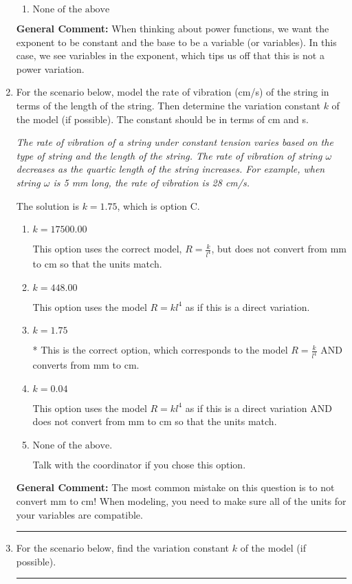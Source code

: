 \documentclass{extbook}[14pt]
\newcommand{\litem}[1]{\item #1

\rule{\textwidth}{0.4pt}}
\begin{document}
\begin{enumerate}
{\begin{enumerate}[label=\Alph*.]
\item \( \text{None of the above} \)


\end{enumerate}

\textbf{General Comment:} When thinking about power functions, we want the exponent to be constant and the base to be a variable (or variables). In this case, we see variables in the exponent, which tips us off that this is not a power variation.
}
\litem{
For the scenario below, model the rate of vibration (cm/s) of the string in terms of the length of the string. Then determine the variation constant $k$ of the model (if possible). The constant should be in terms of cm and s.

\begin{center}
    \textit{ The rate of vibration of a string under constant tension varies based on the type of string and the length of the string. The rate of vibration of string $\omega$ decreases as the quartic length of the string increases. For example, when string $\omega$ is 5 mm long, the rate of vibration is 28 cm/s. }
\end{center}


The solution is \( k = 1.75 \), which is option C.\begin{enumerate}[label=\Alph*.]
\item \( k = 17500.00 \)

This option uses the correct model, $R = \frac{k}{l^{4}}$, but does not convert from mm to cm so that the units match.
\item \( k = 448.00 \)

This option uses the model $R = kl^{4}$ as if this is a direct variation.
\item \( k = 1.75 \)

* This is the correct option, which corresponds to the model $R = \frac{k}{l^{4}}$ AND converts from mm to cm.
\item \( k = 0.04 \)

This option uses the model $R = kl^{4}$ as if this is a direct variation AND does not convert from mm to cm so that the units match.
\item \( \text{None of the above.} \)

Talk with the coordinator if you chose this option.
\end{enumerate}

\textbf{General Comment:} The most common mistake on this question is to not convert mm to cm! When modeling, you need to make sure all of the units for your variables are compatible.
}
\litem{
For the scenario below, find the variation constant $k$ of the model (if possible).

}
\end{enumerate}
\end{document}
